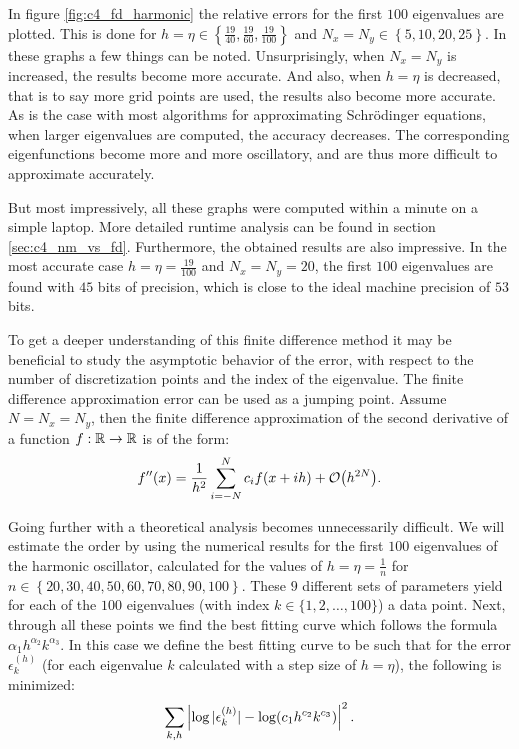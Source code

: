 In figure \ref{fig:c4_fd_harmonic} the relative errors for the first $100$ eigenvalues are plotted. This is done for $h = \eta \in \left\{\frac{19}{40}, \frac{19}{60}, \frac{19}{100}\right\}$ and $N_x = N_y \in \left\{ 5, 10, 20, 25 \right\}$. In these graphs a few things can be noted. Unsurprisingly, when $N_x = N_y$ is increased, the results become more accurate. And also, when $h = \eta$ is decreased, that is to say more grid points are used, the results also become more accurate. As is the case with most algorithms for approximating Schrödinger equations, when larger eigenvalues are computed, the accuracy decreases. The corresponding eigenfunctions become more and more oscillatory, and are thus more difficult to approximate accurately.

But most impressively, all these graphs were computed within a minute on a simple laptop. More detailed runtime analysis can be found in section \ref{sec:c4_nm_vs_fd}. Furthermore, the obtained results are also impressive. In the most accurate case $h= \eta = \frac{19}{100}$ and $N_x = N_y = 20$, the first $100$ eigenvalues are found with $45$ bits of precision, which is close to the ideal machine precision of $53$ bits.

To get a deeper understanding of this finite difference method it may be beneficial to study the asymptotic behavior of the error, with respect to the number of discretization points and the index of the eigenvalue. The finite difference approximation error can be used as a jumping point. Assume $N = N_x = N_y$, then the finite difference approximation of the second derivative of a function $f : \mathbb{R} \to \mathbb{R}$ is of the form:
$$
    f''(x) = \frac{1}{h^2}\sum_{i=-N}^{N} c_{i} f(x + i h) + \OO\mleft(h^{2N}\mright)\text{.}
$$

Going further with a theoretical analysis becomes unnecessarily difficult. We will estimate the order by using the numerical results for the first $100$ eigenvalues of the harmonic oscillator, calculated for the values of $h = \eta = \frac{1}{n}$ for $n \in \left\{20, 30, 40, 50, 60, 70, 80, 90, 100\right\}$. These $9$ different sets of parameters yield for each of the $100$ eigenvalues (with index $k \in \{1, 2, \dots, 100\}$) a data point. Next, through all these points we find the best fitting curve which follows the formula $\alpha_1 h^{\alpha_2} k^{\alpha_3}$. In this case we define the best fitting curve to be such that for the error $\epsilon_k^{(h)}$ (for each eigenvalue $k$ calculated with a step size of $h = \eta$), the following is minimized:
$$
    \sum_{k, h}\left|\log|\epsilon_{k}^{(h)}| - \log\mleft(c_1 h^{c_2} k^{c_3}\mright)\right|^2 \text{.}
$$

